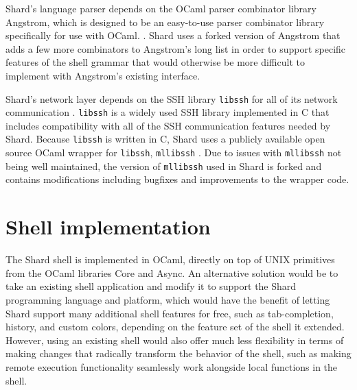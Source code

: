 \documentclass[oneside]{report}
\begin{document}
Shard's language parser depends on the OCaml parser combinator library Angstrom, which is designed to be an easy-to-use parser combinator library specifically for use with OCaml. \cite{ocamlangstrom}.
Shard uses a forked version of Angstrom that adds a few more combinators to Angstrom's long list in order to support specific features of the shell grammar that would otherwise be more difficult to implement with Angstrom's existing interface.

Shard's network layer depends on the SSH library \texttt{libssh} for all of its network communication \cite{libssh}.
\texttt{libssh} is a widely used SSH library implemented in C that includes compatibility with all of the SSH communication features needed by Shard.
Because \texttt{libssh} is written in C, Shard uses a publicly available open source OCaml wrapper for \texttt{libssh}, \texttt{mllibssh} \cite{mllibssh}.
Due to issues with \texttt{mllibssh} not being well maintained, the version of \texttt{mllibssh} used in Shard is forked and contains modifications including bugfixes and improvements to the wrapper code.


\section{Shell implementation}


The Shard shell is implemented in OCaml, directly on top of UNIX primitives from the OCaml libraries Core and Async.
An alternative solution would be to take an existing shell application and modify it to support the Shard programming language and platform, which would have the benefit of letting Shard support many additional shell features for free, such as tab-completion, history, and custom colors, depending on the feature set of the shell it extended.
However, using an existing shell would also offer much less flexibility in terms of making changes that radically transform the behavior of the shell, such as making remote execution functionality seamlessly work alongside local functions in the shell.
\end{document}
